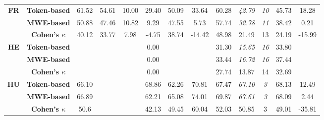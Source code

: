 \documentclass[output=paper
,modfonts
,nonflat,draftmode]{langsci/langscibook}
\begin{document}
\begin{table}
{\begin{tabular}{ccccccccccccc}
\textbf{\scriptsize{}FR} & \textbf{\scriptsize{}Token-based} & {\scriptsize{}61.52} & {\scriptsize{}54.61} & {\scriptsize{}10.00} & {\scriptsize{}29.40} & {\scriptsize{}50.09} & {\scriptsize{}33.64} & {\scriptsize{}60.28} & \emph{\scriptsize{}42.79} & \textit{\scriptsize{}10} & {\scriptsize{}45.73} & {\scriptsize{}18.28}\tabularnewline
 & \textbf{\scriptsize{}MWE-based} & {\scriptsize{}50.88} & {\scriptsize{}47.46} & {\scriptsize{}10.82} & {\scriptsize{}9.29} & {\scriptsize{}47.55} & {\scriptsize{}5.73} & {\scriptsize{}57.74} & \emph{\scriptsize{}32.78} & \textit{\scriptsize{}11} & {\scriptsize{}38.42} & {\scriptsize{}0.21}\tabularnewline
   & \textbf{\scriptsize{}Cohen's $\kappa$} &\scriptsize{40.12}&\scriptsize{33.77}  &\scriptsize{7.98}  & \scriptsize{-4.75} &\scriptsize{38.74}  &\scriptsize{-14.42}  &\scriptsize{48.98} &\scriptsize{21.49}  &\scriptsize{13} & \scriptsize{24.19} &\scriptsize{-15.99}  \tabularnewline
\midrule 

\textbf{\scriptsize{}HE} & \textbf{\scriptsize{}Token-based} &  &  &  & {\scriptsize{}0.00} &  &  & {\scriptsize{}31.30} & \emph{\scriptsize{}15.65} & \textit{\scriptsize{}16} & {\scriptsize{}33.80} & \tabularnewline
 & \textbf{\scriptsize{}MWE-based} &  &  &  & {\scriptsize{}0.00} &  &  & {\scriptsize{}33.44} & \emph{\scriptsize{}16.72} & \textit{\scriptsize{}16} & {\scriptsize{}37.44} & \tabularnewline
   & \textbf{\scriptsize{}Cohen's $\kappa$} &\scriptsize{}  &\scriptsize{}  &\scriptsize{}  & \scriptsize{0.00} &\scriptsize{}  &\scriptsize{}  &\scriptsize{27.74} &\scriptsize{13.87}  &\scriptsize{14} & \scriptsize{32.69} &\scriptsize{}  \tabularnewline
\midrule 

\textbf{\scriptsize{}HU} & \textbf{\scriptsize{}Token-based} & {\scriptsize{}66.10} &  &  & {\scriptsize{}68.86} & {\scriptsize{}62.26} & {\scriptsize{}70.81} & {\scriptsize{}67.47} & \emph{\scriptsize{}67.10} & \textit{\scriptsize{}3} & {\scriptsize{}68.13} & {\scriptsize{}12.49}\tabularnewline
 & \textbf{\scriptsize{}MWE-based} & {\scriptsize{}66.89} &  &  & {\scriptsize{}62.21} & {\scriptsize{}65.08} & {\scriptsize{}74.01} & {\scriptsize{}69.87} & \emph{\scriptsize{}67.61} & \textit{\scriptsize{}3} & {\scriptsize{}68.09} & {\scriptsize{}2.44}\tabularnewline
   & \textbf{\scriptsize{}Cohen's $\kappa$} &\scriptsize{50.6}  &\scriptsize{}  &\scriptsize{}  & \scriptsize{42.13} &\scriptsize{49.45}  &\scriptsize{60.04}  &\scriptsize{52.03} &\scriptsize{50.85}  &\scriptsize{3} & \scriptsize{49.01} &\scriptsize{-35.81} \tabularnewline
\midrule 


\end{tabular}}
\end{table}
\end{document}
